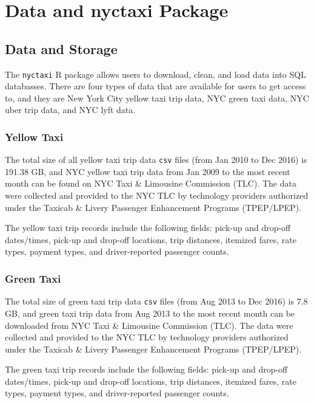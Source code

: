 \documentclass[12pt,twoside]{reedthesis}
\theoremstyle{definition}
\theoremstyle{definition}
\theoremstyle{definition}
\theoremstyle{remark}
\begin{document}
\chapter{Data and nyctaxi Package}\label{chapter1}

\section{Data and Storage}\label{data-and-storage}

The \texttt{nyctaxi} R package allows users to download, clean, and load
data into SQL databasses. There are four types of data that are
available for users to get access to, and they are New York City yellow
taxi trip data, NYC green taxi data, NYC uber trip data, and NYC lyft
data.

\subsection{Yellow Taxi}\label{yellow-taxi-1}

The total size of all yellow taxi trip data \texttt{csv} files (from Jan
2010 to Dec 2016) is 191.38 GB, and NYC yellow taxi trip data from Jan
2009 to the most recent month can be found on NYC Taxi \& Limousine
Commission (TLC). The data were collected and provided to the NYC TLC by
technology providers authorized under the Taxicab \& Livery Passenger
Enhancement Programs (TPEP/LPEP).

The yellow taxi trip records include the following fields: pick-up and
drop-off dates/times, pick-up and drop-off locations, trip distances,
itemized fares, rate types, payment types, and driver-reported passenger
counts.

\subsection{Green Taxi}\label{green-taxi-1}

The total size of green taxi trip data \texttt{csv} files (from Aug 2013
to Dec 2016) is 7.8 GB, and green taxi trip data from Aug 2013 to the
most recent month can be downloaded from NYC Taxi \& Limousine
Commission (TLC). The data were collected and provided to the NYC TLC by
technology providers authorized under the Taxicab \& Livery Passenger
Enhancement Programs (TPEP/LPEP).

The green taxi trip records include the following fields: pick-up and
drop-off dates/times, pick-up and drop-off locations, trip distances,
itemized fares, rate types, payment types, and driver-reported passenger
counts.
\end{document}
